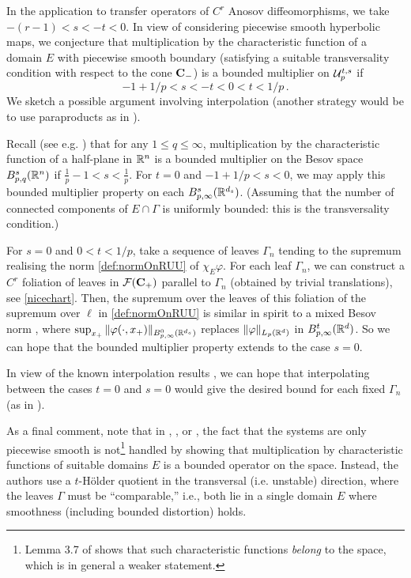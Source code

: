 \documentclass[10pt,twoside]{amsart}
\begin{document}
\begin{remark}\label{pw}
In the application to transfer operators of $C^r$ Anosov diffeomorphisms, we  take $-(r-1)<s<-t<0$.
In view of considering piecewise smooth hyperbolic maps, 
we conjecture that multiplication by 
the characteristic function of a domain $E$ with piecewise smooth
boundary (satisfying \cite{BG1,BG2} a suitable transversality 
condition with respect  to the  cone $\mathbf{C}_-$)
is a bounded multiplier on $\mathcal{U}^{t,s}_p$ if 
$$-1+1/p<s<-t<0<t<1/p \, . $$
We sketch a possible argument  involving interpolation (another strategy would be to use
paraproducts as in \cite[\S4.6.3]{RS}).  

Recall (see e.g. \cite[Thm 4.6.3/1]{RS})
that for any  $1\le q\le \infty$, multiplication
by the characteristic function of a half-plane in $\mathbb{R}^n$ is a bounded multiplier
on the Besov space $B^s_{p,q}(\mathbb{R}^n)$ if 
$
\frac{1}{p}-1 < s < \frac{1}{p}
$.
For $t=0$ and $-1+1/p<s<0$, we may
apply this bounded multiplier property on each $B^s_{p,\infty}(\mathbb{R}^{d_s})$.
(Assuming that the number of connected components
of $E\cap \Gamma$ is uniformly bounded: this is the transversality condition.)

For $s=0$ and $0<t<1/p$, take a sequence of leaves $\Gamma_n$ tending to the supremum
realising the norm  \eqref{def:normOnRUU} of $\chi_E \varphi$.
For each leaf $\Gamma_n$, we can construct a $C^r$ foliation of leaves
in $\mathcal{F}(\mathbf{C}_+)$ parallel
to $\Gamma_n$ (obtained by trivial translations), see \eqref{nicechart}.
Then,   the supremum over the leaves of this foliation
of the supremum over $\ell$ in \eqref{def:normOnRUU}
is similar in spirit
to a mixed Besov \cite{BIN} norm ,
 where $\sup_{x_+} \|\varphi(\cdot, x_+)\|_{B^0_{p,\infty}(\mathbb{R}^{d_s})}$
replaces  $\|\varphi\|_{L_p(\mathbb{R}^d)}$ in $B^t_{p,\infty}(\mathbb{R}^d)$. So we can hope that the bounded
multiplier property extends to the case $s=0$.

In view of the known interpolation results
 \cite[\S 30]{BIN},
we can hope  that 
interpolating between the cases $t=0$ and $s=0$ would give the desired bound for each fixed $\Gamma_n$
(as in \cite[Lemma 23]{BG1}).



As a final comment, note that in \cite{DL}, \cite{DZ}, or \cite{BDL}, the fact that the systems
are only piecewise smooth is not\footnote{Lemma 3.7 of \cite{DZ}  shows that
such characteristic functions {\it belong} to the space, which is in general a weaker
statement.} handled  by showing that multiplication by
characteristic functions of suitable domains $E$ is a bounded operator on the space.
Instead, the authors use  a $t$-H\"older quotient in the transversal (i.e. unstable) 
direction, where
the leaves $\Gamma$ must be ``comparable,'' i.e., both lie in a single domain $E$
where smoothness  (including bounded distortion) holds.
\end{remark}
\end{document}
